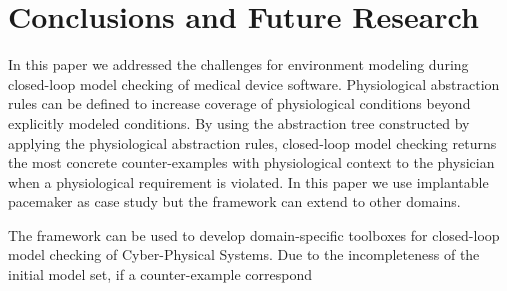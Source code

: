 \section{Conclusions and Future Research}
\label{conclusions}
In this paper we addressed the challenges for environment modeling during closed-loop model checking of medical device software. Physiological abstraction rules can be defined to increase coverage of physiological conditions beyond explicitly modeled conditions. By using the abstraction tree constructed by applying the physiological abstraction rules, closed-loop model checking returns the most concrete counter-examples with physiological context to the physician when a physiological requirement is violated. In this paper we use implantable pacemaker as case study but the framework can extend to other domains.

The framework can be used to develop domain-specific toolboxes for closed-loop model checking of Cyber-Physical Systems. Due to the incompleteness of the initial model set, if a counter-example correspond